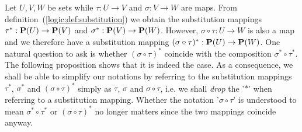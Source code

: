 Let $U,V,W$ be sets while $\tau:U\to V$ and $\sigma:V\to W$ are
maps. From definition~(\ref{logic:def:substitution}) we obtain the
substitution mappings $\tau^{*}:{\bf P}(U)\to\mbox{${\bf P}(V)$}$ and
$\sigma^{*}:\mbox{${\bf P}(V)$}\to{\bf P}(W)$. However, $\sigma\circ\tau:U\to W$ is
also a map and we therefore have a substitution mapping
$(\sigma\circ\tau)^{*}:{\bf P}(U)\to{\bf P}(W)$. One natural
question to ask is whether $(\sigma\circ\tau)^{*}$ coincide with the
composition $\sigma^{*}\circ\tau^{*}$. The following proposition
shows that it is indeed the case. As a consequence, we shall be able
to simplify our notations by referring to the substitution mappings
$\tau^{*}$, $\sigma^{*}$ and $(\sigma\circ\tau)^{*}$ simply as
$\tau$, $\sigma$ and $\sigma\circ\tau$, i.e.  we shall {\em drop}
the '$*$' when referring to a substitution mapping. Whether the
notation '$\sigma\circ\tau$' is understood to mean
$\sigma^{*}\circ\tau^{*}$ or $(\sigma\circ\tau)^{*}$ no longer
matters since the two mappings coincide anyway.

